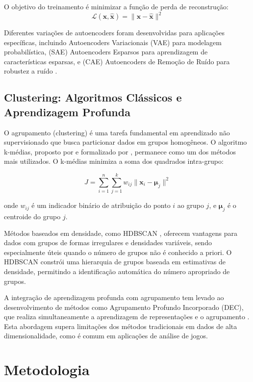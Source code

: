 \documentclass[12pt]{article}
\begin{document}
O objetivo do treinamento é minimizar a função de perda de reconstrução:
\begin{equation}
\mathcal{L}(\mathbf{x}, \hat{\mathbf{x}}) = \|\mathbf{x} - \hat{\mathbf{x}}\|^2
\end{equation}

Diferentes variações de autoencoders foram desenvolvidas para aplicações específicas, incluindo Autoencoders Variacionais (VAE) para modelagem probabilística, (SAE) Autoencoders Esparsos para aprendizagem de características esparsas, e (CAE) Autoencoders de Remoção de Ruído para robustez a ruído \cite{baldi2012autoencoders, le2015tutorial}.


\subsection{Clustering: Algoritmos Clássicos e Aprendizagem Profunda}

O agrupamento (clustering) é uma tarefa fundamental em aprendizado não supervisionado que busca particionar dados em grupos homogêneos. O algoritmo k-médias, proposto por \cite{macqueen1967some} e formalizado por \cite{lloyd1982least}, permanece como um dos métodos mais utilizados. O k-médias minimiza a soma dos quadrados intra-grupo:

\begin{equation}
J = \sum_{i=1}^{n} \sum_{j=1}^{k} w_{ij}\|\mathbf{x}_i - \boldsymbol{\mu}_j\|^2
\end{equation}

onde $w_{ij}$ é um indicador binário de atribuição do ponto $i$ ao grupo $j$, e $\boldsymbol{\mu}_j$ é o centroide do grupo $j$.

Métodos baseados em densidade, como HDBSCAN \cite{campello2013density}, oferecem vantagens para dados com grupos de formas irregulares e densidades variáveis, sendo especialmente úteis quando o número de grupos não é conhecido a priori. O HDBSCAN constrói uma hierarquia de grupos baseada em estimativas de densidade, permitindo a identificação automática do número apropriado de grupos.

A integração de aprendizagem profunda com agrupamento tem levado ao desenvolvimento de métodos como Agrupamento Profundo Incorporado (DEC), que realiza simultaneamente a aprendizagem de representações e o agrupamento \cite{xie2016unsupervised}. Esta abordagem supera limitações dos métodos tradicionais em dados de alta dimensionalidade, como é comum em aplicações de análise de jogos.

\section{Metodologia}
\end{document}
